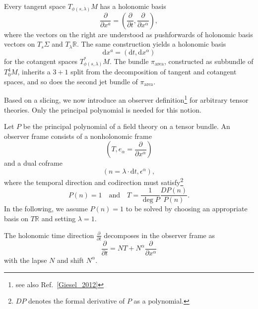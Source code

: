 Every tangent space $T_{\phi(s,\lambda)}M$ has a holonomic basis
\begin{equation}
  \frac{\partial}{\partial x^a} = \left( \frac{\partial}{\partial t},\frac{\partial}{\partial x^\alpha}\right),
\end{equation}
where the vectors on the right are understood as pushforwards of holonomic basis vectors on $T_s\Sigma$ and $T_\lambda\mathbb R$. The same construction yields a holonomic basis
\begin{equation}
  \mathrm dx^a = (\mathrm dt, \mathrm dx^\alpha)
\end{equation}
for the cotangent spaces $T_{\phi(s,\lambda)}^\ast M$. The bundle $\pi_\text{area}$, constructed as subbundle of $T^4_0M$, inherits a $3+1$ split from the decomposition of tangent and cotangent spaces, and so does the second jet bundle of $\pi_\text{area}$.

Based on a slicing, we now introduce an observer definition\footnote{see also Ref.~\ref{Giesel_2012}} for arbitrary tensor theories. Only the principal polynomial is needed for this notion.
\begin{definition}
  Let $P$ be the principal polynomial of a field theory on a tensor bundle. An observer frame consists of a nonholonomic frame
  \begin{equation}
    (T, e_\alpha = \frac{\partial}{\partial x^\alpha})
  \end{equation}
  and a dual coframe
  \begin{equation}
    (n = \lambda\cdot \mathrm dt, \epsilon^{\alpha}),
  \end{equation}
  where the temporal direction and codirection must satisfy\footnote{$DP$ denotes the formal derivative of $P$ as a polynomial.}
  \begin{equation}\label{frame_conditions}
    P(n) = 1\quad\text{and}\quad T=\frac{1}{\operatorname{deg}P}\frac{DP(n)}{P(n)}.
  \end{equation}
  In the following, we assume $P(n) = 1$ to be solved by choosing an appropriate basis on $T\mathbb R$ and setting $\lambda = 1$.

  The holonomic time direction $\frac{\partial}{\partial t}$ decomposes in the observer frame as
  \begin{equation}
    \frac{\partial}{\partial t} = NT + N^\alpha \frac{\partial}{\partial x^\alpha}
  \end{equation}
  with the lapse $N$ and shift $N^\alpha$.
\end{definition}

